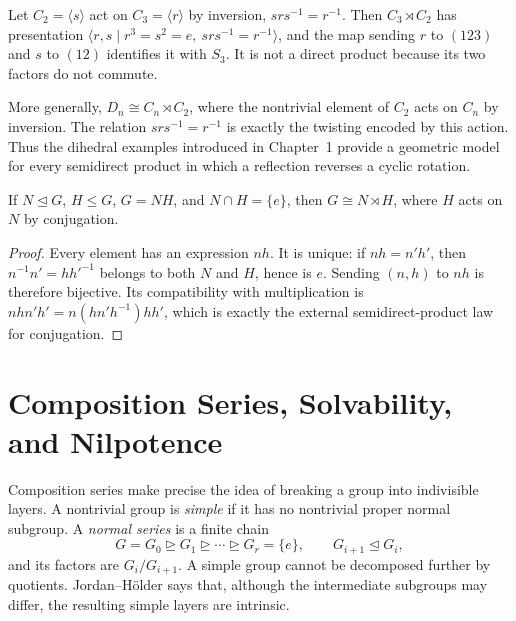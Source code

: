 \begin{example}
Let \(C_2=\langle s\rangle\) act on \(C_3=\langle r\rangle\) by inversion,
\(srs^{-1}=r^{-1}\).  Then \(C_3\rtimes C_2\) has presentation
\(\langle r,s\mid r^3=s^2=e,\ srs^{-1}=r^{-1}\rangle\), and the map sending
\(r\) to \((123)\) and \(s\) to \((12)\) identifies it with \(S_3\).  It is
not a direct product because its two factors do not commute.
\end{example}

\begin{example}
More generally, \(D_n\cong C_n\rtimes C_2\), where the nontrivial element of
\(C_2\) acts on \(C_n\) by inversion.  The relation \(srs^{-1}=r^{-1}\) is
exactly the twisting encoded by this action.  Thus the dihedral examples
introduced in Chapter~1 provide a geometric model for every semidirect product
in which a reflection reverses a cyclic rotation.
\end{example}

\begin{proposition}\label{prop:internal-semiproduct}
If \(N\trianglelefteq G\), \(H\leq G\), \(G=NH\), and \(N\cap H=\{e\}\), then
\(G\cong N\rtimes H\), where \(H\) acts on \(N\) by conjugation.
\end{proposition}
\begin{proof}
Every element has an expression \(nh\).  It is unique: if \(nh=n'h'\), then
\(n^{-1}n'=hh'^{-1}\) belongs to both \(N\) and \(H\), hence is \(e\).
Sending \((n,h)\) to \(nh\) is therefore bijective.  Its compatibility with multiplication is
\(nhn'h'=n(hn'h^{-1})hh'\), which is exactly the external semidirect-product
law for conjugation.
\end{proof}

\section{Composition Series, Solvability, and Nilpotence}

Composition series make precise the idea of breaking a group into indivisible
layers. A nontrivial group is \emph{simple} if it has no nontrivial proper
normal subgroup. A \emph{normal series} is a finite chain
\[
G=G_0\trianglerighteq G_1\trianglerighteq\cdots
\trianglerighteq G_r=\{e\},
\qquad G_{i+1}\trianglelefteq G_i,
\]
and its factors are \(G_i/G_{i+1}\). A simple group cannot
be decomposed further by quotients.  Jordan--H\"older says that, although the
intermediate subgroups may differ, the resulting simple layers are intrinsic.

